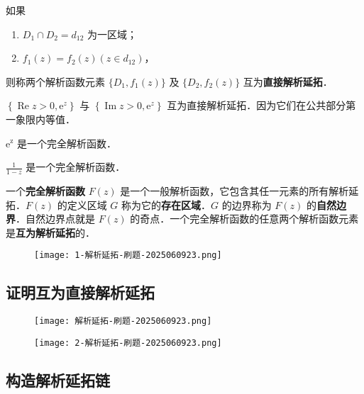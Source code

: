 \begin{definition}[定义 8.3]
如果
	\begin{enumerate}
		\item $D_1 \cap D_2=d_{12}$ 为一区域；
		\item $f_1(z)=f_2(z)(z \in d_{12})$，
	\end{enumerate}
则称两个解析函数元素 $\{D_1, f_1(z)\}$ 及 $\{D_2, f_2(z)\}$ 互为\textbf{直接解析延拓}．
\end{definition}
\begin{example}
$\left\{\operatorname{Re} z>0, \mathrm{e}^z\right\}$ 与 $\left\{\operatorname{Im} z>0, \mathrm{e}^z\right\}$ 互为直接解析延拓．因为它们在公共部分第一象限内等值．
\end{example}
\begin{remark}
$\mathrm{e}^{\mathrm{z}}$ 是一个完全解析函数．
\end{remark}
\begin{remark}
$\frac{1}{1-z}$ 是一个完全解析函数．
\end{remark}
\begin{definition}[定义 8.7]
一个\textbf{完全解析函数} $F(z)$ 是一个一般解析函数，它包含其任一元素的所有解析延拓．$F(z)$ 的定义区域 $G$ 称为它的\textbf{存在区域}．$G$ 的边界称为 $F(z)$ 的\textbf{自然边界}．自然边界点就是 $F(z)$ 的奇点．一个完全解析函数的任意两个解析函数元素是\textbf{互为解析延拓}的．
\end{definition}
\begin{figure}[H]
\centering
\texttt{[image: 1-解析延拓-刷题-2025060923.png]}
\label{}
\end{figure}

\subsection{证明互为直接解析延拓}

\begin{figure}[H]
\centering
\texttt{[image: 解析延拓-刷题-2025060923.png]}
\label{}
\end{figure}

\begin{figure}[H]
\centering
\texttt{[image: 2-解析延拓-刷题-2025060923.png]}
\label{}
\end{figure}

\subsection{构造解析延拓链}

